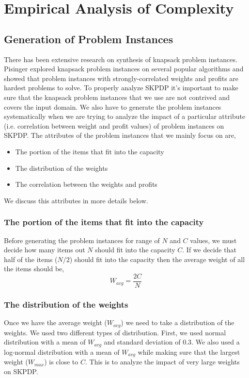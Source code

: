 \chapter{Empirical Analysis of Complexity}

\label{chap:analysis}

\section{Generation of Problem Instances}

There has been extensive research on synthesis of knapsack problem instances. Pisinger \cite{Pisinger:2005:HKP:1063636.1063640} explored knapsack problem instances on several popular algorithms and showed that problem instances with strongly-correlated weights and profits are hardest problems to solve. To properly analyze SKPDP it's important to make sure that the knapsack problem instances that we use are not contrived and covers the input domain. We also have to generate the problem instances systematically when we are trying to analyze the impact of a particular attribute (i.e. correlation between weight and profit values) of problem instances on SKPDP. The attributes of the problem instances that we mainly focus on are, 

\begin{itemize}
\item The portion of the items that fit into the capacity
\item The distribution of the weights
\item The correlation between the weights and profits
\end{itemize}

We discuss this attributes in more details below.
\subsection{The portion of the items that fit into the capacity}
Before generating the problem instances for range of $N$ and $C$ values, we must decide how many items out $N$ should fit into the capacity $C$. If we decide that half of the items ($N/2$) should fit into the capacity then the average weight of all the items should be,
\[
W_{avg} = \frac{2C}{N}
\]

\subsection{The distribution of the weights}
Once we have the average weight ($W_{avg}$) we need to take a distribution of the weights. We used two different types of distribution. First, we used normal distribution with a mean of $W_{avg}$ and standard deviation of $0.3$. We also used a log-normal distribution with a mean of $W_{avg}$ while making sure that the largest weight ($W_{max}$) is close to $C$. This is to analyze the impact of very large weights on SKPDP.

